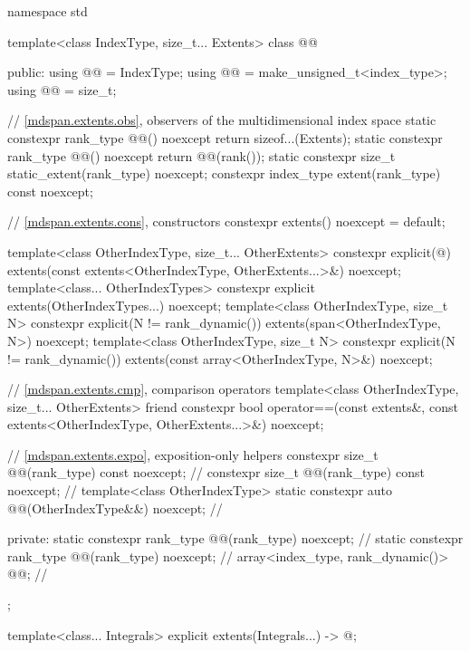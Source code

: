 \begin{codeblock}
namespace std {
  template<class IndexType, size_t... Extents>
  class @@ {
  public:
    using @@ = IndexType;
    using @@ = make_unsigned_t<index_type>;
    using @@ = size_t;

    // \ref{mdspan.extents.obs}, observers of the multidimensional index space
    static constexpr rank_type @@() noexcept { return sizeof...(Extents); }
    static constexpr rank_type @@() noexcept { return @@(rank()); }
    static constexpr size_t static_extent(rank_type) noexcept;
    constexpr index_type extent(rank_type) const noexcept;

    // \ref{mdspan.extents.cons}, constructors
    constexpr extents() noexcept = default;

    template<class OtherIndexType, size_t... OtherExtents>
      constexpr explicit(@\seebelow@)
        extents(const extents<OtherIndexType, OtherExtents...>&) noexcept;
    template<class... OtherIndexTypes>
      constexpr explicit extents(OtherIndexTypes...) noexcept;
    template<class OtherIndexType, size_t N>
      constexpr explicit(N != rank_dynamic())
        extents(span<OtherIndexType, N>) noexcept;
    template<class OtherIndexType, size_t N>
      constexpr explicit(N != rank_dynamic())
        extents(const array<OtherIndexType, N>&) noexcept;

    // \ref{mdspan.extents.cmp}, comparison operators
    template<class OtherIndexType, size_t... OtherExtents>
      friend constexpr bool operator==(const extents&,
                                       const extents<OtherIndexType, OtherExtents...>&) noexcept;

    // \ref{mdspan.extents.expo}, exposition-only helpers
    constexpr size_t @@(rank_type) const noexcept;     // \expos
    constexpr size_t @@(rank_type) const noexcept;     // \expos
    template<class OtherIndexType>
      static constexpr auto @@(OtherIndexType&&) noexcept;      // \expos

  private:
    static constexpr rank_type @@(rank_type) noexcept;       // \expos
    static constexpr rank_type @@(rank_type) noexcept;   // \expos
    array<index_type, rank_dynamic()> @@{};                // \expos
  };

  template<class... Integrals>
    explicit extents(Integrals...)
      -> @\seebelow@;
}
\end{codeblock}

